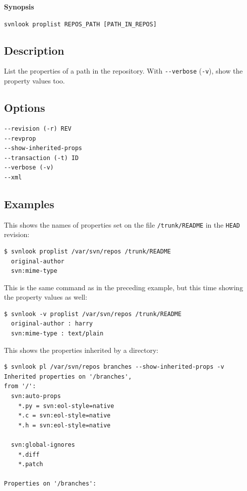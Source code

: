 \textbf{Synopsis}

\texttt{svnlook\ proplist\ REPOS\_PATH\ {[}PATH\_IN\_REPOS{]}}

\subsection{Description}

List the properties of a path in the repository. With
\texttt{-\/-verbose} (\texttt{-v}), show the property values too.

\subsection{Options}

\begin{verbatim}
--revision (-r) REV
--revprop
--show-inherited-props
--transaction (-t) ID
--verbose (-v)
--xml
\end{verbatim}

\subsection{Examples}

This shows the names of properties set on the file
\texttt{/trunk/README} in the \texttt{HEAD} revision:

\begin{verbatim}
$ svnlook proplist /var/svn/repos /trunk/README
  original-author
  svn:mime-type
\end{verbatim}

This is the same command as in the preceding example, but this time
showing the property values as well:

\begin{verbatim}
$ svnlook -v proplist /var/svn/repos /trunk/README
  original-author : harry
  svn:mime-type : text/plain
\end{verbatim}

This shows the properties inherited by a directory:

\begin{verbatim}
$ svnlook pl /var/svn/repos branches --show-inherited-props -v
Inherited properties on '/branches',
from '/':
  svn:auto-props
    *.py = svn:eol-style=native
    *.c = svn:eol-style=native
    *.h = svn:eol-style=native

  svn:global-ignores
    *.diff
    *.patch

Properties on '/branches':
\end{verbatim}

